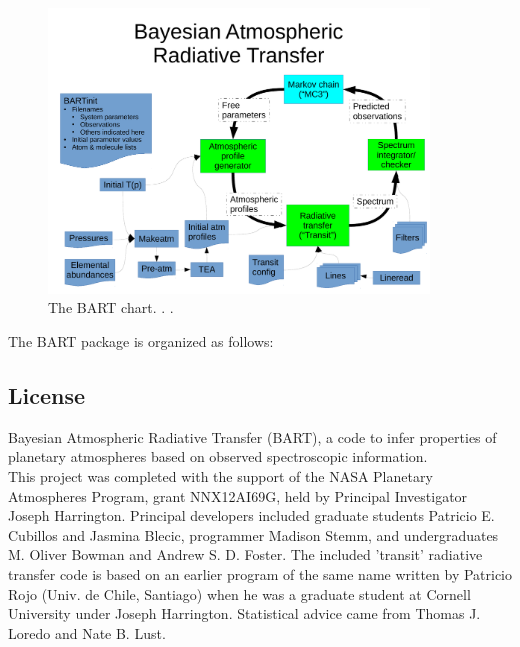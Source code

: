 \documentclass[letterpaper, 12pt]{article}
\begin{document}
\begin{figure}[htb]
\centerline{
\includegraphics[width=0.9\textwidth, clip]{figs/BARTcharts}}
\caption{\small \label{fig:BARTchart} The BART chart. . .}
\end{figure}


The BART package is organized as follows: \newline
\noindent{}
\vspace{0.7cm}


\subsection{License}
\label{sec:license}

Bayesian Atmospheric Radiative Transfer (BART), a code to infer
properties of planetary atmospheres based on observed spectroscopic
information. \\

This project was completed with the support of the NASA Planetary
Atmospheres Program, grant NNX12AI69G, held by Principal Investigator
Joseph Harrington. Principal developers included graduate students
Patricio E. Cubillos and Jasmina Blecic, programmer Madison Stemm, and
undergraduates M. Oliver Bowman and Andrew S. D. Foster.  The included
'transit' radiative transfer code is based on an earlier program of
the same name written by Patricio Rojo (Univ. de Chile, Santiago) when
he was a graduate student at Cornell University under Joseph
Harrington.  Statistical advice came from Thomas J. Loredo and Nate
B. Lust. \newline
\end{document}
